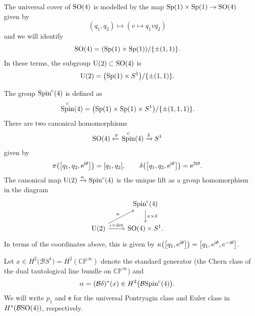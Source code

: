 \documentclass[pdftex]{sigma}%
\newcommand{\CP}{\mathbb{CP}}
\DeclareMathOperator{\Spin}{Spin}
\numberwithin{equation}{section}
\begin{document}
The universal cover of ${\rm SO}(4)$ is modelled by the map ${\rm Sp}(1) \times {\rm Sp}(1) \to {\rm SO}(4)$
given by
\[ (q_1, q_2) \mapsto \left( v \mapsto q_1 v \overline{q_2} \right) \]
and we will identify
\[
{\rm SO}(4) = ({\rm Sp}(1) \times {\rm Sp}(1))/\{\pm (1,1)\}.
\]
In these terms, the subgroup ${\rm U}(2) \subset {\rm SO}(4)$ is
\[
{\rm U}(2) = \big({\rm Sp}(1) \times S^1\big)/\{\pm (1,1)\}.
\]

The group $\Spin^{\rm c}(4)$ is defined as
\[
\Spin^{\rm c}(4) = \big({\rm Sp}(1) \times {\rm Sp}(1) \times S^1\big)/\{\pm(1,1,1)\}.
\]
There are two canonical homomorphisms
\begin{equation}\label{canonichom}
{\rm SO}(4) \xleftarrow{\pi} \Spin^{\rm c}(4) \xrightarrow{\delta} S^1
\end{equation}
given by
\[
\pi\big( \big[q_1,q_2,{\rm e}^{{\rm i}\theta}\big]\big) = [q_1,q_2],
\qquad
\delta\big( \big[q_1,q_2, {\rm e}^{{\rm i}\theta}\big]\big) = {\rm e}^{2{\rm i}\theta}.
\]
The canonical map ${\rm U}(2) \xrightarrow{\kappa} \Spin^{\rm c}(4)$ is the unique lift as a group
homomorphism in the diagram
\[
\begin{tikzcd}
& \Spin^{\rm c}(4) \ar["\pi \times \delta",d] \\
{\rm U}(2) \ar["\kappa",ur] \ar["\iota \times \det", r] & {\rm SO}(4)\times S^1.
\end{tikzcd}
\]
In terms of the coordinates above, this is given by $\kappa\big(\big[q_1,{\rm e}^{{\rm i}\theta}\big]\big)=\big[q_1,{\rm e}^{{\rm i}\theta},{\rm e}^{-{\rm i}\theta}\big]$.

Let $x \in H^2\big({\mathcal B}S ^1\big)=H^2(\CP^\infty)$ denote the standard generator (the Chern class
of the dual tautological line bundle on $\CP^\infty$) and
\[
\alpha= ({\mathcal B}\delta)^*(x) \in H^2\big({\mathcal B}{\rm Spin}^{\rm c}(4)\big).
\]
We will write $p_1$ and $\mathsf{e}$ for the universal Pontryagin class and Euler class in
$H^*({\mathcal B}{\rm SO}(4))$, respectively.
\end{document}
